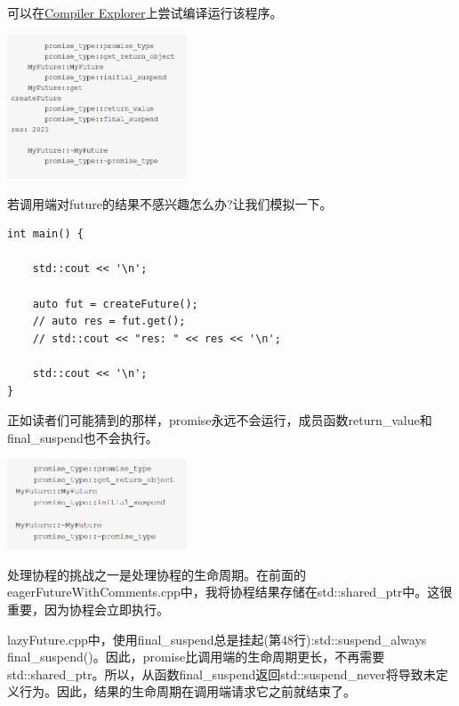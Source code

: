 可以在\href{https://godbolt.org/z/EejWcj}{Compiler Explorer}上尝试编译运行该程序。

\begin{center}
\includegraphics[width=0.4\textwidth]{content/3/chapter7/images/9.png}\\
\end{center}

若调用端对future的结果不感兴趣怎么办?让我们模拟一下。

\begin{lstlisting}[style=styleCXX]
int main() {
	
	std::cout << '\n';
	
	auto fut = createFuture();
	// auto res = fut.get();
	// std::cout << "res: " << res << '\n';
	
	std::cout << '\n';
}
\end{lstlisting}

正如读者们可能猜到的那样，promise永远不会运行，成员函数return\_value和final\_suspend也不会执行。

\begin{center}
\includegraphics[width=0.4\textwidth]{content/3/chapter7/images/10.png}\\
\end{center}

\begin{tcolorbox}[breakable,enhanced jigsaw,colback=red!5!white,colframe=red!75!black,title={关于数据}]
处理协程的挑战之一是处理协程的生命周期。在前面的eagerFutureWithComments.cpp中，我将协程结果存储在std::shared\_ptr中。这很重要，因为协程会立即执行。

lazyFuture.cpp中，使用final\_suspend总是挂起(第48行):std::suspend\_always final\_suspend()。因此，promise比调用端的生命周期更长，不再需要std::shared\_ptr。所以，从函数final\_suspend返回std::suspend\_never将导致未定义行为。因此，结果的生命周期在调用端请求它之前就结束了。
\end{tcolorbox}


